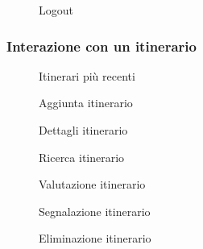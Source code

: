 \documentclass{natourDoc}
\begin{document}
\begin{figure}[!htbp]
	\centering
	
	\caption{Logout}
\end{figure}
\FloatBarrier

\subsubsection{Interazione con un itinerario}
\begin{figure}[!htbp]
	\centering
	
	\caption{Itinerari più recenti}
\end{figure}
\FloatBarrier

\begin{figure}[!htbp]
	\centering
	
	\caption{Aggiunta itinerario}
\end{figure}
\FloatBarrier

\begin{figure}[!htbp]
	\centering
	
	\caption{Dettagli itinerario}
\end{figure}
\FloatBarrier

\begin{figure}[!htbp]
	\centering
	
	\caption{Ricerca itinerario}
\end{figure}
\FloatBarrier

\begin{figure}[!htbp]
	\centering
	
	\caption{Valutazione itinerario}
\end{figure}
\FloatBarrier

\begin{figure}[!htbp]
	\centering
	
	\caption{Segnalazione itinerario}
\end{figure}
\FloatBarrier

\begin{figure}[!htbp]
	\centering
	
	\caption{Eliminazione itinerario}
\end{figure}
\FloatBarrier

\newpage
\end{document}
